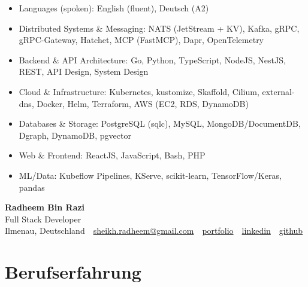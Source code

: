 \documentclass[10pt,a4paper]{resume}
\makeatletter
\newcommand{\Portfolio}{https://radheem.github.io/my-cv}
\newcommand{\PortfolioText}{portfolio}
\newcommand{\GitHub}{https://github.com/radheem}
\newcommand{\LinkedIn}{https://www.linkedin.com/in/radheem-razi}
\newcommand{\Email}{sheikh.radheem@gmail.com}
\makeatother
\begin{document}
\begin{itemize}[leftmargin=1.4em,nosep,topsep=2pt]
  \item Languages (spoken): English (fluent), Deutsch (A2)
  \item Distributed Systems \& Messaging: NATS (JetStream + KV), Kafka, gRPC, gRPC-Gateway, Hatchet, MCP (FastMCP), Dapr, OpenTelemetry
  \item Backend \& API Architecture: Go, Python, TypeScript, NodeJS, NestJS, REST, API Design, System Design
  \item Cloud \& Infrastructure: Kubernetes, kustomize, Skaffold, Cilium, external-dns, Docker, Helm, Terraform, AWS (EC2, RDS, DynamoDB)
  \item Databases \& Storage: PostgreSQL (sqlc), MySQL, MongoDB/DocumentDB, Dgraph, DynamoDB, pgvector
  \item Web \& Frontend: ReactJS, JavaScript, Bash, PHP
  \item ML/Data: Kubeflow Pipelines, KServe, scikit-learn, TensorFlow/Keras, pandas
\end{itemize}

\clearpage
{}

\begin{center}
  {\huge\bfseries Radheem Bin Razi}\\[3pt]
  {\large Full Stack Developer}\\[6pt]
  \small
  Ilmenau, Deutschland \,\textbar\,
  \href{mailto:\Email}{\Email} \,\textbar\,
  \href{\Portfolio}{\PortfolioText} \,\textbar\,
  \href{\LinkedIn}{linkedin} \,\textbar\,
  \href{\GitHub}{github}
\end{center}
\vspace{2pt}

\section{Berufserfahrung}
\end{document}
